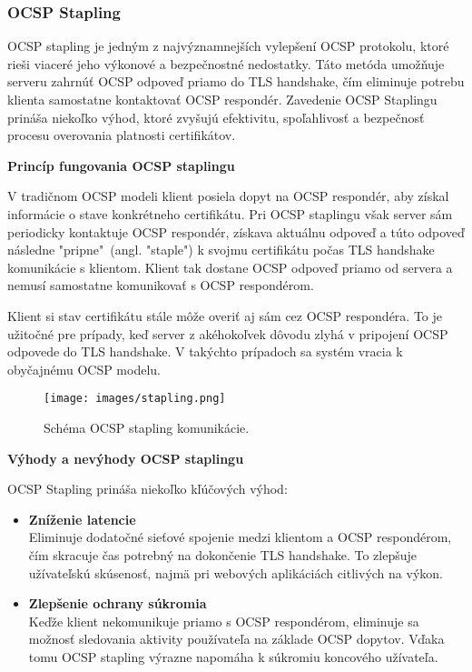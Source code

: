 \documentclass[12pt, twoside]{book}
\newcommand{\subsubsubsection}[1]{%
  \vspace{0.2em}  
  \textbf{#1} \\[0.2em]
  \hspace*{\parindent}
}
\begin{document}
\subsubsection{OCSP Stapling}
OCSP stapling je jedným z najvýznamnejších vylepšení OCSP protokolu, ktoré rieši viaceré jeho výkonové a bezpečnostné nedostatky. Táto metóda umožňuje serveru zahrnúť OCSP odpoveď priamo do TLS handshake, čím eliminuje potrebu klienta samostatne kontaktovať OCSP respondér. Zavedenie OCSP Staplingu prináša niekoľko výhod, ktoré zvyšujú efektivitu, spoľahlivosť a bezpečnosť procesu overovania platnosti certifikátov.\cite{security_pki, survey, turin2, must_staple}

\subsubsubsection{Princíp fungovania OCSP staplingu}
V tradičnom OCSP modeli klient posiela dopyt na OCSP respondér, aby získal informácie o stave konkrétneho certifikátu. Pri OCSP staplingu však server sám periodicky kontaktuje OCSP respondér, získava aktuálnu odpoveď a túto odpoveď následne "pripne"\ (angl. "staple") k svojmu certifikátu počas TLS handshake komunikácie s klientom. Klient tak dostane OCSP odpoveď priamo od servera a nemusí samostatne komunikovať s OCSP respondérom.\cite{security_pki, survey}

Klient si stav certifikátu stále môže overiť aj sám cez OCSP respondéra. To je užitočné pre prípady, keď server z akéhokoľvek dôvodu zlyhá v pripojení OCSP odpovede do TLS handshake. V takýchto prípadoch sa systém vracia k obyčajnému OCSP modelu.\cite{must_staple}

\begin{figure}[H]
\centering
\texttt{[image: images/stapling.png]}
\caption{Schéma OCSP stapling komunikácie.}
\end{figure}

\subsubsubsection{Výhody a  nevýhody OCSP staplingu}
OCSP Stapling prináša niekoľko kľúčových výhod:

\begin{itemize}
\item \textbf{Zníženie latencie} \\
Eliminuje dodatočné sieťové spojenie medzi klientom a OCSP respondérom, čím skracuje čas potrebný na dokončenie TLS handshake. To zlepšuje užívateľskú skúsenosť, najmä pri webových aplikáciách citlivých na výkon.\cite{stapling_adoption}

\item \textbf{Zlepšenie ochrany súkromia} \\
Keďže klient nekomunikuje priamo s OCSP respondérom, eliminuje sa možnosť sledovania aktivity používateľa na základe OCSP dopytov. Vďaka tomu OCSP stapling výrazne  napomáha k súkromiu koncového užívateľa.\cite{survey, muni}

\end{itemize}
\end{document}
